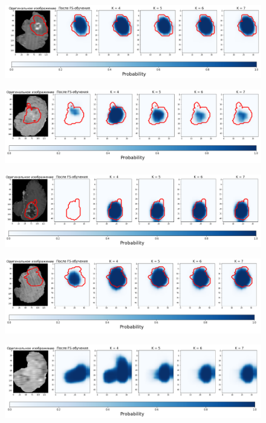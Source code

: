 \begin{figure}[h!] 
  \center
  \includegraphics [scale=0.7] {images/good_5.png}
\end{figure}


\begin{figure}[h!] 
  \center
  \includegraphics [scale=0.7] {images/good_6.png}
\end{figure}

\begin{figure}[h!] 
  \center
  \includegraphics [scale=0.7] {images/good_7.png}
\end{figure}

\begin{figure}[h!] 
  \center
  \includegraphics [scale=0.7] {images/good_8.png}
\end{figure}

\begin{figure}[h!] 
  \center
  \includegraphics [scale=0.7] {images/good_9.png}
\end{figure}


